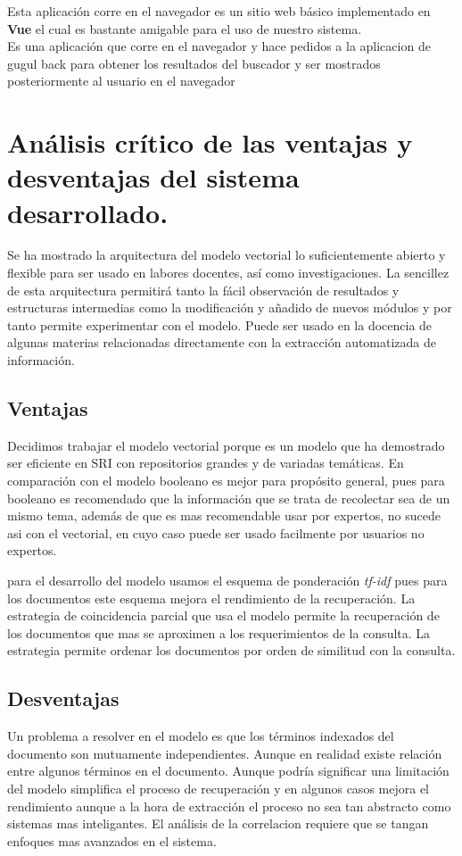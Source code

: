 \documentclass{llncs}
\begin{document}
	
	\begin{flushleft}
		Esta aplicaci\'on corre en el navegador es un sitio web b\'asico implementado en \textbf{Vue} el cual es bastante amigable para el uso de nuestro sistema.
		\\
		Es una aplicaci\'on que corre en el navegador y hace pedidos a la aplicacion de gugul back para obtener los resultados del buscador y ser mostrados posteriormente al usuario en el navegador  
	\end{flushleft}
	
	\section{An\'alisis cr\'itico de las ventajas y desventajas del sistema desarrollado.}
	
	
	Se ha mostrado la arquitectura del modelo vectorial lo suficientemente abierto y flexible para ser usado en labores docentes, as\'i como investigaciones. La sencillez de esta arquitectura permitir\'a tanto la f\'acil observaci\'on de resultados y estructuras intermedias como la modificaci\'on y a\~nadido de nuevos m\'odulos y por tanto permite experimentar con el modelo. Puede ser usado en la docencia de algunas materias relacionadas directamente con la extracci\'on automatizada de informaci\'on.
	
	
	\subsection{Ventajas}
	Decidimos trabajar el modelo vectorial porque es un modelo que ha demostrado ser eficiente en SRI con repositorios grandes y de variadas tem\'aticas. En comparaci\'on con el modelo booleano es mejor para prop\'osito general, pues para booleano es recomendado que la informaci\'on que se trata de recolectar sea de un mismo tema, adem\'as de que es mas recomendable usar por expertos, no sucede asi con el vectorial, en cuyo caso puede ser usado facilmente por usuarios no expertos.
	
	para el desarrollo del modelo usamos el esquema de ponderaci\'on \textit{tf-idf} pues para los documentos este esquema mejora el rendimiento de la recuperaci\'on. La estrategia de coincidencia parcial que usa el modelo permite la recuperaci\'on de los documentos que mas se aproximen a los requerimientos de la consulta. La estrategia permite ordenar los documentos por orden de similitud con la consulta.
	
	\subsection{Desventajas}
	Un problema a resolver en el modelo es que  los t\'erminos indexados del documento son mutuamente independientes. Aunque en realidad existe relaci\'on entre algunos t\'erminos en el documento. Aunque podr\'ia significar una limitaci\'on del modelo simplifica el proceso de recuperaci\'on y en algunos casos mejora el rendimiento aunque a la hora de extracci\'on el proceso no sea tan abstracto como sistemas mas inteligantes. El an\'alisis de la correlacion requiere que se tangan enfoques mas avanzados en el sistema.
	
\end{document}
